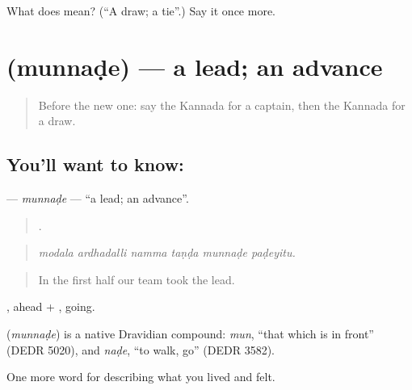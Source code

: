 \begin{tcolorbox}[breakable,colback=teal!4,colframe=teal!35!black,title={Before you move on}]
What does  mean? (\textquotedblleft{}A draw; a tie\textquotedblright{}.) Say it once more.
\end{tcolorbox}
\section[\texorpdfstring{\kn{ಮುನ್ನಡೆ} (munnaḍe)}{ಮುನ್ನಡೆ (munnaḍe)}]{ (munnaḍe) — a lead; an advance}

\label{lesson:KA-C539-munnade}



\begin{quote}
Before the new one: say the Kannada for a captain, then the Kannada for a draw.
\end{quote}

\subsection*{You'll want to know: }
\textbf{} — \emph{munnaḍe} — \textquotedblleft{}a lead; an advance\textquotedblright{}.

\begin{quote}
     .
\end{quote}

\begin{quote}
\emph{modala ardhadalli namma taṇḍa munnaḍe paḍeyitu.}
\end{quote}

\begin{quote}
In the first half our team took the lead.
\end{quote}

, ahead + , going.

\begin{cousinweb}
\textbf{} (\emph{munnaḍe}) is a native Dravidian compound: \emph{mun}, \textquotedblleft{}that which is in front\textquotedblright{} (DEDR 5020), and \emph{naḍe}, \textquotedblleft{}to walk, go\textquotedblright{} (DEDR 3582).
\end{cousinweb}

\begin{grammarlens}[title={What you've built}]
One more word for describing what you lived and felt.
\end{grammarlens}

